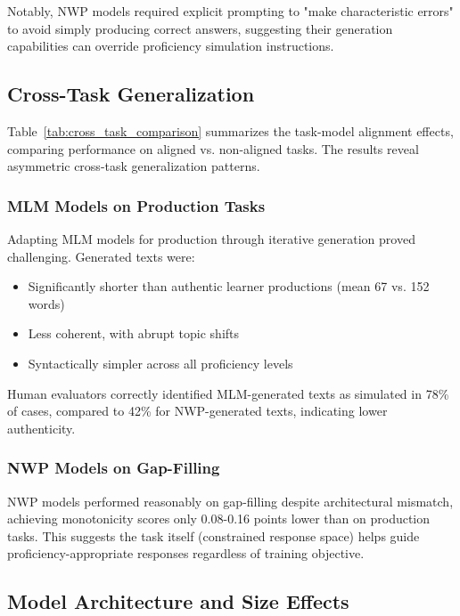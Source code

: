 Notably, NWP models required explicit prompting to "make characteristic errors" to avoid simply producing correct answers, suggesting their generation capabilities can override proficiency simulation instructions.

\subsection{Cross-Task Generalization}

Table~\ref{tab:cross_task_comparison} summarizes the task-model alignment effects, comparing performance on aligned vs. non-aligned tasks. The results reveal asymmetric cross-task generalization patterns.



\subsubsection{MLM Models on Production Tasks}

Adapting MLM models for production through iterative generation proved challenging. Generated texts were:
\begin{itemize}
    \item Significantly shorter than authentic learner productions (mean 67 vs. 152 words)
    \item Less coherent, with abrupt topic shifts
    \item Syntactically simpler across all proficiency levels
\end{itemize}

Human evaluators correctly identified MLM-generated texts as simulated in 78\% of cases, compared to 42\% for NWP-generated texts, indicating lower authenticity.

\subsubsection{NWP Models on Gap-Filling}

NWP models performed reasonably on gap-filling despite architectural mismatch, achieving monotonicity scores only 0.08-0.16 points lower than on production tasks. This suggests the task itself (constrained response space) helps guide proficiency-appropriate responses regardless of training objective.

\subsection{Model Architecture and Size Effects}

